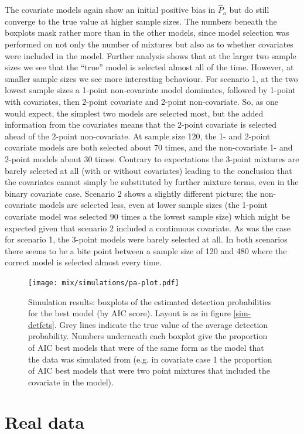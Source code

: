 The covariate models again show an initial positive bias in $\hat{P}_a$ but do still converge to the true value at higher sample sizes. The numbers beneath the boxplots mask rather more than in the other models, since model selection was performed on not only the number of mixtures but also as to whether covariates were included in the model. Further analysis shows that at the larger two sample sizes we see that the ``true'' model is selected almost all of the time. However,  at smaller sample sizes we see more interesting behaviour. For scenario 1, at the two lowest sample sizes a 1-point non-covariate model dominates, followed by 1-point with covariates, then 2-point covariate and 2-point non-covariate. So, as one would expect, the simplest two models are selected most, but the added information from the covariates means that the 2-point covariate is selected ahead of the 2-point non-covariate. At sample size 120, the 1- and 2-point covariate models are both selected about 70 times, and the non-covariate 1- and 2-point models about 30 times. Contrary to expectations the 3-point mixtures are barely selected at all (with or without covariates) leading to the conclusion that the covariates cannot simply be substituted by further mixture terms, even in the binary covariate case. Scenario 2 shows a slightly different picture; the non-covariate models are selected less, even at lower sample sizes (the 1-point covariate model was selected 90 times a the lowest sample size) which might be expected given that scenario 2 included a continuous covariate. As was the case for scenario 1, the 3-point models were barely selected at all. In both scenarios there seems to be a bite point between a sample size of 120 and 480 where the correct model is selected almost every time.
	

\begin{figure}
\centering
\texttt{[image: mix/simulations/pa-plot.pdf]}
\caption{Simulation results: boxplots of the estimated detection probabilities for the best model (by AIC score). Layout is as in figure \ref{sim-detfcts}. Grey lines indicate the true value of the average detection probability. Numbers underneath each boxplot give the proportion of AIC best models that were of the same form as the model that the data was simulated from (e.g. in covariate case 1 the proportion of AIC best models that were two point mixtures that included the covariate in the model).}
\label{sim-boxplots}
\end{figure}


\section{Real data}
\label{s:data}

